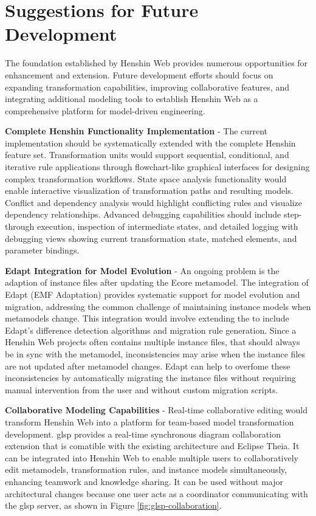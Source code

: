   \section{Suggestions for Future Development}
  \label{subsec:suggestions-future-development}

  The foundation established by Henshin Web provides numerous opportunities for enhancement and extension. Future development efforts should focus on expanding transformation capabilities, improving collaborative features, and integrating additional modeling tools to establish Henshin Web as a comprehensive platform for model-driven engineering.

 \textbf{Complete Henshin Functionality Implementation} - The current implementation should be systematically extended with the complete Henshin feature set. Transformation units would support sequential, conditional, and iterative rule applications through flowchart-like graphical interfaces for designing complex transformation workflows. State space analysis functionality would enable interactive visualization of transformation paths and resulting models. Conflict and dependency analysis would highlight conflicting rules and visualize dependency relationships. Advanced debugging capabilities should include step-through execution, inspection of intermediate states, and detailed logging with debugging views showing current transformation state, matched elements, and parameter bindings.
 
  \textbf{Edapt Integration for Model Evolution} - An ongoing problem is the adaption of instance files after updating the Ecore metamodel. The integration of Edapt (EMF Adaptation) \cite{edapt-repo}provides systematic support for model evolution and migration, addressing the common challenge of maintaining instance models when metamodels change. This integration would involve extending the  to include Edapt's difference detection algorithms and migration rule generation. Since a Henshin Web projects often contains multiple instance files, that should always be in sync with the metamodel, inconsistencies may arise when the instance files are not updated after metamodel changes. Edapt can help to overfome these inconsistencies by automatically migrating the instance files without requiring manual intervention from the user and without custom migration scripts.

  \textbf{Collaborative Modeling Capabilities} -  Real-time collaborative editing would transform Henshin Web into a platform for team-based model transformation development. \ac{glsp} provides a real-time synchronous diagram collaboration extension \cite{glsp-collab} that is comatible with the existing architecture and Eclipse Theia. It can be integrated into Henshin Web to enable multiple users to collaboratively edit metamodels, transformation rules, and instance models simultaneously, enhancing teamwork and knowledge sharing. It can be used without major architectural changes because one user acts as a coordinator communicating with the \ac{glsp} server, as shown in Figure \ref{fig:glsp-collaboration}.

